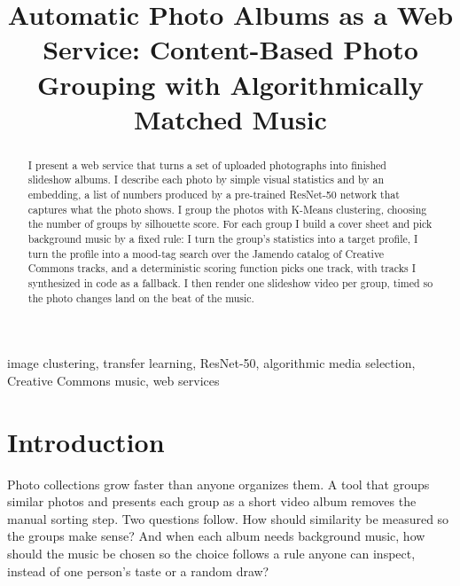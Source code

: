 \documentclass[conference]{IEEEtran}
\begin{document}
\title{Automatic Photo Albums as a Web Service: Content-Based Photo
Grouping with Algorithmically Matched Music}

\author{
}

\maketitle

\begin{abstract}
I present a web service that turns a set of uploaded photographs
into finished slideshow albums. I describe each photo by simple
visual statistics and by an embedding, a list of numbers produced
by a pre-trained ResNet-50 network that captures what the photo
shows. I group the photos with K-Means clustering, choosing the
number of groups by silhouette score. For each group I build a
cover sheet and pick background music by a fixed rule: I turn the
group's statistics into a target profile, I turn the profile into
a mood-tag search over the Jamendo catalog of Creative Commons
tracks, and a deterministic scoring function picks one track, with
tracks I synthesized in code as a fallback. I then render one
slideshow video per group, timed so the photo changes land on the
beat of the music.
\end{abstract}

\begin{IEEEkeywords}
image clustering, transfer learning, ResNet-50, algorithmic media
selection, Creative Commons music, web services
\end{IEEEkeywords}

\section{Introduction}
Photo collections grow faster than anyone organizes them. A tool
that groups similar photos and presents each group as a short video
album removes the manual sorting step. Two questions follow. How
should similarity be measured so the groups make sense? And when
each album needs background music, how should the music be chosen
so the choice follows a rule anyone can inspect, instead of one
person's taste or a random draw?
\end{document}
